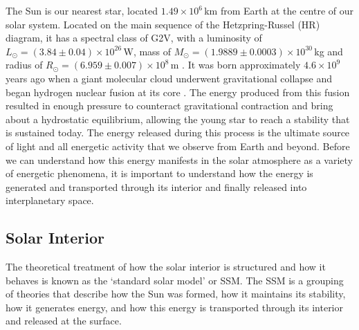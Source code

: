 The Sun is our nearest star, located $1.49\times10^6$\,km from Earth at the centre of our solar system. Located on the main sequence of the Hetzpring-Russel (HR) diagram, it has a spectral class of G2V, with a luminosity of $L_{\odot}=(3.84\pm 0.04)\times10^{26}$\,W, mass of $M_{\odot}=(1.9889\pm0.0003)\times10^{30}$\,kg and radius of $R_{\odot}=(6.959\pm0.007)\times10^8$\,m \citep{foukal2004}. It was born approximately $4.6 \times 10^9$\,years ago when a giant molecular cloud underwent gravitational collapse and began hydrogen nuclear fusion at its core \citep{montmerle2006, bouvier2010}. The energy produced from this fusion resulted in enough pressure to counteract gravitational contraction and bring about a hydrostatic equilibrium, allowing the young star to reach a stability that is sustained today. 
%
The energy released during this process is the ultimate source of light and all energetic activity that we observe from Earth and beyond. Before we can understand how this energy manifests in the solar atmosphere as a variety of energetic phenomena, it is important to understand how the energy is generated and transported through its interior and finally released into interplanetary space.

\subsection{Solar Interior}\label{sec:10}

The theoretical treatment of how the solar interior is structured and how it behaves is known as the \textquoteleft standard solar model' or SSM. The SSM is a grouping of theories that describe how the Sun was formed, how it maintains its stability, how it generates energy, and how this energy is transported through its interior and released at the surface. 

